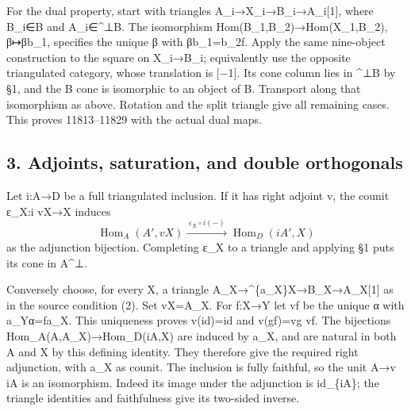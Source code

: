 \documentclass[11pt]{article}
\begin{document}
For the dual property,\allowbreak{} start with triangles A\_\allowbreak{}i\allowbreak{}→X\_\allowbreak{}i\allowbreak{}→B\_\allowbreak{}i\allowbreak{}→A\_\allowbreak{}i[1]\allowbreak{},\allowbreak{} where B\_\allowbreak{}i\allowbreak{}∈B and A\_\allowbreak{}i\allowbreak{}∈\textasciicircum{}⊥B. The isomorphism Hom(B\_\allowbreak{}1,\allowbreak{}B\_\allowbreak{}2)\allowbreak{}\allowbreak{}→Hom(X\_\allowbreak{}1,\allowbreak{}B\_\allowbreak{}2)\allowbreak{},\allowbreak{} β\allowbreak{}↦βb\_\allowbreak{}1,\allowbreak{} specifies the unique β with βb\_\allowbreak{}1\allowbreak{}=b\_\allowbreak{}2f. Apply the same nine-object construction to the square on X\_\allowbreak{}i\allowbreak{}→B\_\allowbreak{}i; equivalently use the opposite triangulated category,\allowbreak{} whose translation is [−1]\allowbreak{}. Its cone column lies in \^{}⊥B by §1,\allowbreak{} and the B cone is isomorphic to an object of B. Transport along that isomorphism as above. Rotation and the split triangle give all remaining cases. This proves 11813–\allowbreak{}11829 with the actual dual maps.

\subsection{\texorpdfstring{3. Adjoints,\allowbreak{} saturation,\allowbreak{} and double orthogonals}{3.   and double orthogonals}}\label{proofs-11665-12003-adjoints-saturation-and-double-orthogonals}

Let i:\allowbreak{}A\allowbreak{}→D be a full triangulated inclusion. If it has right adjoint v,\allowbreak{} the counit ε\_\allowbreak{}X:\allowbreak{}i vX\allowbreak{}→X induces \[
 \operatorname{Hom}_A(A',vX)
   \xrightarrow{\ \varepsilon_X\circ i(-)\ }
 \operatorname{Hom}_D(iA',X)
\] as the adjunction bijection. Completing ε\_\allowbreak{}X to a triangle and applying §1 puts its cone in A\^{}⊥.

Conversely choose,\allowbreak{} for every X,\allowbreak{} a triangle A\_\allowbreak{}X\allowbreak{}→\textasciicircum{}\{a\_\allowbreak{}X\}X\allowbreak{}→B\_\allowbreak{}X\allowbreak{}→A\_\allowbreak{}X[1]\allowbreak{} as in the source condition (2)\allowbreak{}. Set vX\allowbreak{}=A\_\allowbreak{}X. For f:\allowbreak{}X\allowbreak{}→Y let vf be the unique α with a\_\allowbreak{}Yα\allowbreak{}=fa\_\allowbreak{}X. This uniqueness proves v(id)\allowbreak{}\allowbreak{}=id and v(gf)\allowbreak{}\allowbreak{}=vg vf. The bijections Hom\_\allowbreak{}A(A,\allowbreak{}A\_\allowbreak{}X)\allowbreak{}\allowbreak{}→Hom\_\allowbreak{}D(iA,\allowbreak{}X)\allowbreak{} are induced by a\_\allowbreak{}X,\allowbreak{} and are natural in both A and X by this defining identity. They therefore give the required right adjunction,\allowbreak{} with a\_\allowbreak{}X as counit. The inclusion is fully faithful,\allowbreak{} so the unit A\allowbreak{}→v iA is an isomorphism. Indeed its image under the adjunction is id\_\allowbreak{}\{iA\}; the triangle identities and faithfulness give its two-sided inverse.
\end{document}
